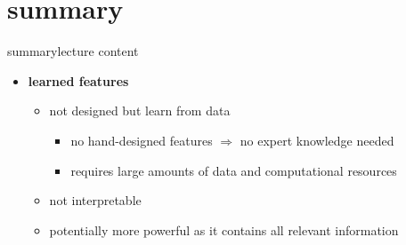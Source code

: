     \section{summary}
        \begin{frame}{summary}{lecture content}
            \begin{itemize}
                \item   \textbf{learned features}
                    \begin{itemize}
                        \item   not designed but learn from data
                            \begin{itemize}
                                \item   no hand-designed features $\Rightarrow$ no expert knowledge needed
                                \item   requires large amounts of data and computational resources
                            \end{itemize}
                        \smallskip
                        \item   not interpretable
                        \item   potentially more powerful as it contains all relevant information
                    \end{itemize}
            \end{itemize}
        \end{frame}

